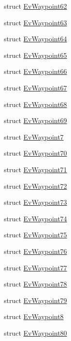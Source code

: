 \begin{DoxyCompactItemize}
\item 
struct \hyperlink{structmove__base__z__client_1_1EvWaypoint62}{Ev\+Waypoint62}
\item 
struct \hyperlink{structmove__base__z__client_1_1EvWaypoint63}{Ev\+Waypoint63}
\item 
struct \hyperlink{structmove__base__z__client_1_1EvWaypoint64}{Ev\+Waypoint64}
\item 
struct \hyperlink{structmove__base__z__client_1_1EvWaypoint65}{Ev\+Waypoint65}
\item 
struct \hyperlink{structmove__base__z__client_1_1EvWaypoint66}{Ev\+Waypoint66}
\item 
struct \hyperlink{structmove__base__z__client_1_1EvWaypoint67}{Ev\+Waypoint67}
\item 
struct \hyperlink{structmove__base__z__client_1_1EvWaypoint68}{Ev\+Waypoint68}
\item 
struct \hyperlink{structmove__base__z__client_1_1EvWaypoint69}{Ev\+Waypoint69}
\item 
struct \hyperlink{structmove__base__z__client_1_1EvWaypoint7}{Ev\+Waypoint7}
\item 
struct \hyperlink{structmove__base__z__client_1_1EvWaypoint70}{Ev\+Waypoint70}
\item 
struct \hyperlink{structmove__base__z__client_1_1EvWaypoint71}{Ev\+Waypoint71}
\item 
struct \hyperlink{structmove__base__z__client_1_1EvWaypoint72}{Ev\+Waypoint72}
\item 
struct \hyperlink{structmove__base__z__client_1_1EvWaypoint73}{Ev\+Waypoint73}
\item 
struct \hyperlink{structmove__base__z__client_1_1EvWaypoint74}{Ev\+Waypoint74}
\item 
struct \hyperlink{structmove__base__z__client_1_1EvWaypoint75}{Ev\+Waypoint75}
\item 
struct \hyperlink{structmove__base__z__client_1_1EvWaypoint76}{Ev\+Waypoint76}
\item 
struct \hyperlink{structmove__base__z__client_1_1EvWaypoint77}{Ev\+Waypoint77}
\item 
struct \hyperlink{structmove__base__z__client_1_1EvWaypoint78}{Ev\+Waypoint78}
\item 
struct \hyperlink{structmove__base__z__client_1_1EvWaypoint79}{Ev\+Waypoint79}
\item 
struct \hyperlink{structmove__base__z__client_1_1EvWaypoint8}{Ev\+Waypoint8}
\item 
struct \hyperlink{structmove__base__z__client_1_1EvWaypoint80}{Ev\+Waypoint80}

\end{DoxyCompactItemize}
